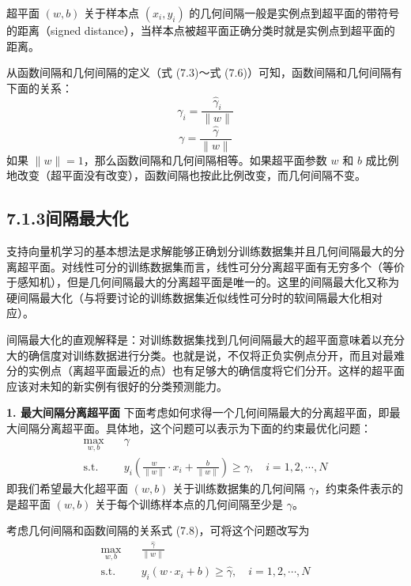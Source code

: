 \documentclass[UTF8,12pt,a4paper,fontset=fandol]{ctexart}
\begin{document}
超平面 $(w,b)$ 关于样本点 $(x_i,y_i)$ 的几何间隔一般是实例点到超平面的带符号的距离（signed distance），当样本点被超平面正确分类时就是实例点到超平面的距离。

从函数间隔和几何间隔的定义（式 (7.3)～式 (7.6)）可知，函数间隔和几何间隔有下面的关系：
\begin{equation}
\gamma_i=\frac{\hat{\gamma}_i}{\|w\|}
\tag{7.7}
\end{equation}
\begin{equation}
\gamma=\frac{\hat{\gamma}}{\|w\|}
\tag{7.8}
\end{equation}
如果 $\|w\|=1$，那么函数间隔和几何间隔相等。如果超平面参数 $w$ 和 $b$ 成比例地改变（超平面没有改变），函数间隔也按此比例改变，而几何间隔不变。

\subsection*{7.1.3\quad 间隔最大化}

支持向量机学习的基本想法是求解能够正确划分训练数据集并且几何间隔最大的分离超平面。对线性可分的训练数据集而言，线性可分分离超平面有无穷多个（等价于感知机），但是几何间隔最大的分离超平面是唯一的。这里的间隔最大化又称为硬间隔最大化（与将要讨论的训练数据集近似线性可分时的软间隔最大化相对应）。

间隔最大化的直观解释是：对训练数据集找到几何间隔最大的超平面意味着以充分大的确信度对训练数据进行分类。也就是说，不仅将正负实例点分开，而且对最难分的实例点（离超平面最近的点）也有足够大的确信度将它们分开。这样的超平面应该对未知的新实例有很好的分类预测能力。

\noindent\textbf{1. 最大间隔分离超平面}\quad
下面考虑如何求得一个几何间隔最大的分离超平面，即最大间隔分离超平面。具体地，这个问题可以表示为下面的约束最优化问题：
\begin{equation}
\begin{aligned}
\max_{w,b}\quad & \gamma\\
\mathrm{s.t.}\quad & y_i\left(\frac{w}{\|w\|}\cdot x_i+\frac{b}{\|w\|}\right)\geq \gamma,\quad i=1,2,\cdots,N
\end{aligned}
\tag{7.9--7.10}
\end{equation}
即我们希望最大化超平面 $(w,b)$ 关于训练数据集的几何间隔 $\gamma$，约束条件表示的是超平面 $(w,b)$ 关于每个训练样本点的几何间隔至少是 $\gamma$。

考虑几何间隔和函数间隔的关系式 (7.8)，可将这个问题改写为
\begin{equation}
\begin{aligned}
\max_{w,b}\quad & \frac{\hat{\gamma}}{\|w\|}\\
\mathrm{s.t.}\quad & y_i(w\cdot x_i+b)\geq \hat{\gamma},\quad i=1,2,\cdots,N
\end{aligned}
\tag{7.11--7.12}
\end{equation}
\end{document}
